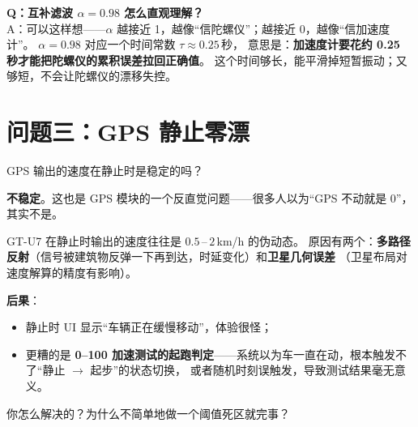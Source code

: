 \documentclass[UTF8,11pt,a4paper]{ctexart}
\begin{document}
\begin{followup}
\textbf{Q：互补滤波 $\alpha = 0.98$ 怎么直观理解？}\\
A：可以这样想——$\alpha$ 越接近 1，越像``信陀螺仪''；越接近 0，越像``信加速度计''。
$\alpha = 0.98$ 对应一个时间常数 $\tau \approx 0.25$\,秒，
意思是：\textbf{加速度计要花约 0.25 秒才能把陀螺仪的累积误差拉回正确值}。
这个时间够长，能平滑掉短暂振动；又够短，不会让陀螺仪的漂移失控。
\end{followup}

\section{问题三：GPS 静止零漂}

\begin{interviewer}
GPS 输出的速度在静止时是稳定的吗？
\end{interviewer}

\begin{candidate}
\textbf{不稳定}。这也是 GPS 模块的一个反直觉问题——很多人以为``GPS 不动就是 0''，其实不是。

GT-U7 在静止时输出的速度往往是 $0.5$\,–\,$2$\,km/h 的伪动态。
原因有两个：\textbf{多路径反射}（信号被建筑物反弹一下再到达，时延变化）和\textbf{卫星几何误差}
（卫星布局对速度解算的精度有影响）。

\medskip
\textbf{后果}：
\begin{itemize}[leftmargin=1.4em,topsep=2pt,itemsep=2pt]
  \item 静止时 UI 显示``车辆正在缓慢移动''，体验很怪；
  \item 更糟的是 \textbf{0--100 加速测试的起跑判定}——系统以为车一直在动，根本触发不了``静止 $\to$ 起步''的状态切换，
        或者随机时刻误触发，导致测试结果毫无意义。
\end{itemize}
\end{candidate}

\begin{interviewer}
你怎么解决的？为什么不简单地做一个阈值死区就完事？
\end{interviewer}
\end{document}
